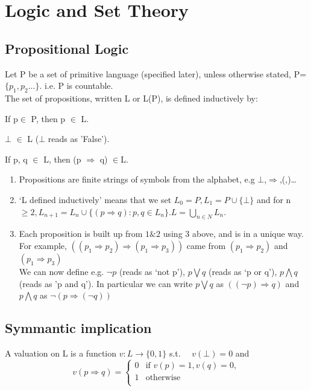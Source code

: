 \chapter{Logic and Set Theory}

\section{Propositional Logic}

Let P be a set of primitive language (specified later), unless
 otherwise stated, P=$\{p_1,p_2\dots\}$\@. i.e. P is countable.\\
The set of propositions, written L or L(P), is defined inductively by:
\ben
\item If p$\in$ P, then p $\in$ L.\\
\item $\bot$ $\in$ L ($\bot$ reads as 'False').\\
\item If p, q $\in$ L, then (p $\Rightarrow$ q) $\in$L.\\
\een 

\begin{remark}
\begin{enumerate}
\item Propositions are finite strings of symbols from the alphabet,
 e.g $\bot$,$\Rightarrow$,(,)\ldots \\
\item `L defined inductively' means that we set $L_0=P, L_1=P\cup \{\bot \}$
and for n $\ge 2,L_{n+1}=L_n \cup \{(p \Rightarrow q):p,q \in L_n \}. L=\bigcup_{n \in N}L_n$. \\
\item Each proposition is built up from $1\&2$ using 3 above,
and is in a unique way.
For example, $((p_1 \Rightarrow p_2) \Rightarrow (p_1 \Rightarrow p_3))$
came from $(p_1 \Rightarrow p_2)$ and $(p_1 \Rightarrow p_3)$ \\
We can now define e.g. $\neg p$ (reads as `not p'), $p \bigvee q$
(reads as `p or q'), $p \bigwedge q$ (reads as 'p and q').
In particular we can write $p \bigvee q$ as $((\neg p) \Rightarrow q)$
and $p \bigwedge q$ as $\neg (p \Rightarrow (\neg q))$
\end{enumerate}
\end{remark}

\section*{Symmantic implication}
\begin{definition}
A valuation on L is a function $v: L \rightarrow \{0,1\}$ s.t.
~~$v(\bot)=0$ and
\flushleft
\begin{equation*}
v(p \Rightarrow q)= \left\{
\begin{array}{ll}
0 & \text{if } v(p)=1, v(q)=0,\\
1 & \text{otherwise } \\
\end{array} \right.
\end{equation*}
\end{definition}

